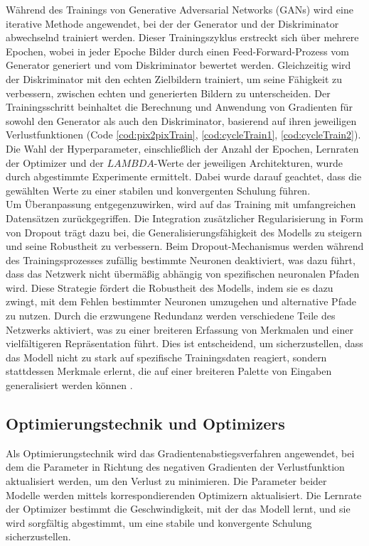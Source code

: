 Während des Trainings von Generative Adversarial Networks (GANs) wird eine iterative Methode angewendet, bei der der Generator und der Diskriminator abwechselnd trainiert werden. Dieser Trainingszyklus erstreckt sich über mehrere Epochen, wobei in jeder Epoche Bilder durch einen Feed-Forward-Prozess vom Generator generiert und vom Diskriminator bewertet werden. Gleichzeitig wird der Diskriminator mit den echten Zielbildern trainiert, um seine Fähigkeit zu verbessern, zwischen echten und generierten Bildern zu unterscheiden. Der Trainingsschritt beinhaltet die Berechnung und Anwendung von Gradienten für sowohl den Generator als auch den Diskriminator, basierend auf ihren jeweiligen Verlustfunktionen (Code \ref{cod:pix2pixTrain}, \ref{cod:cycleTrain1}, \ref{cod:cycleTrain2}).
\\\newline
Die Wahl der Hyperparameter, einschließlich der Anzahl der Epochen, Lernraten der Optimizer und der $LAMBDA$-Werte der jeweiligen Architekturen, wurde durch abgestimmte Experimente ermittelt. Dabei wurde darauf geachtet, dass die gewählten Werte zu einer stabilen und konvergenten Schulung führen.
\\\newline
Um Überanpassung entgegenzuwirken, wird auf das Training mit umfangreichen Datensätzen zurückgegriffen. Die Integration zusätzlicher Regularisierung in Form von Dropout trägt dazu bei, die Generalisierungsfähigkeit des Modells zu steigern und seine Robustheit zu verbessern. Beim Dropout-Mechanismus werden während des Trainingsprozesses zufällig bestimmte Neuronen deaktiviert, was dazu führt, dass das Netzwerk nicht übermäßig abhängig von spezifischen neuronalen Pfaden wird. Diese Strategie fördert die Robustheit des Modells, indem sie es dazu zwingt, mit dem Fehlen bestimmter Neuronen umzugehen und alternative Pfade zu nutzen. Durch die erzwungene Redundanz werden verschiedene Teile des Netzwerks aktiviert, was zu einer breiteren Erfassung von Merkmalen und einer vielfältigeren Repräsentation führt. Dies ist entscheidend, um sicherzustellen, dass das Modell nicht zu stark auf spezifische Trainingsdaten reagiert, sondern stattdessen Merkmale erlernt, die auf einer breiteren Palette von Eingaben generalisiert werden können \cite{Yamashita.2018}. 

\subsection{Optimierungstechnik und Optimizers}
Als Optimierungstechnik wird das Gradientenabstiegsverfahren angewendet, bei dem die Parameter in Richtung des negativen Gradienten der Verlustfunktion aktualisiert werden, um den Verlust zu minimieren. Die Parameter beider Modelle werden mittels korrespondierenden Optimizern aktualisiert. Die Lernrate der Optimizer bestimmt die Geschwindigkeit, mit der das Modell lernt, und sie wird sorgfältig abgestimmt, um eine stabile und konvergente Schulung sicherzustellen.

